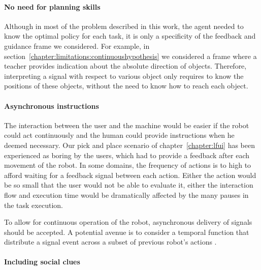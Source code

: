 \paragraph{No need for planning skills}

Although in most of the problem described in this work, the agent needed to know the optimal policy for each task, it is only a specificity of the feedback and guidance frame we considered. For example, in section~\ref{chapter:limitations:continuoushypothesis} we considered a frame where a teacher provides indication about the absolute direction of objects. Therefore, interpreting a signal with respect to various object only requires to know the positions of these objects, without the need to know how to reach each object.


\paragraph{Asynchronous instructions}

The interaction between the user and the machine would be easier if the robot could act continuously and the human could provide instructions when he deemed necessary. Our pick and place scenario of chapter~\ref{chapter:lfui} has been experienced as boring by the users, which had to provide a feedback after each movement of the robot. In some domains, the frequency of actions is to high to afford waiting for a feedback signal between each action. Either the action would be so small that the user would not be able to evaluate it, either the interaction flow and execution time would be dramatically affected by the many pauses in the task execution.

To allow for continuous operation of the robot, asynchronous delivery of signals should be accepted. A potential avenue is to consider a temporal function that distribute a signal event across a subset of previous robot's actions \cite{hockley1984analysis,knox2009interactively}. 


\paragraph{Including social clues}

